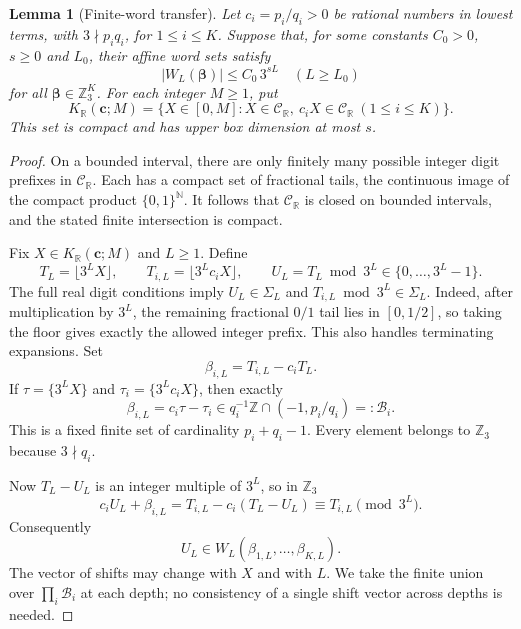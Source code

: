 \documentclass[11pt]{article}
\newtheorem{lemma}[theorem]{Lemma}
\theoremstyle{definition}
\theoremstyle{remark}
\newcommand{\Z}{\mathbb Z}
\newcommand{\R}{\mathbb R}
\newcommand{\Sig}{\Sigma}
\newcommand{\CR}{\mathcal C_{\R}}
\begin{document}
\begin{lemma}[Finite-word transfer]\label{real:lem:transfer}
Let $c_i=p_i/q_i>0$ be rational numbers in lowest terms, with
$3\nmid p_iq_i$, for $1\le i\le K$. Suppose that, for some constants
$C_0>0$, $s\ge0$ and $L_0$, their affine word sets satisfy
\[
 |W_L(\boldsymbol\beta)|\le C_0\,3^{sL}
 \quad(L\ge L_0)
\]
for all $\boldsymbol\beta\in\Z_3^K$. For each integer $M\ge1$, put
\[
 K_{\R}(\boldsymbol c;M)=
 \{X\in[0,M]:X\in\CR,\ c_iX\in\CR\ (1\le i\le K)\}.
\]
This set is compact and has upper box dimension at most $s$.
\end{lemma}
\begin{proof}
On a bounded interval, there are only finitely many possible integer
digit prefixes in $\CR$. Each has a compact set of fractional tails,
the continuous image of the compact product $\{0,1\}^{\mathbb N}$.
It follows that $\CR$ is closed on bounded intervals, and the stated
finite intersection is compact.

Fix $X\in K_{\R}(\boldsymbol c;M)$ and $L\ge1$. Define
\[
 T_L=\lfloor3^LX\rfloor,\qquad
 T_{i,L}=\lfloor3^Lc_iX\rfloor,\qquad
 U_L=T_L\bmod3^L\in\{0,\ldots,3^L-1\}.
\]
The full real digit conditions imply
$U_L\in\Sig_L$ and $T_{i,L}\bmod3^L\in\Sig_L$.
Indeed, after multiplication by $3^L$, the remaining fractional
$0/1$ tail lies in $[0,1/2]$, so taking the floor gives exactly the
allowed integer prefix. This also handles terminating expansions.
Set
\[
 \beta_{i,L}=T_{i,L}-c_iT_L.
\]
If $\tau=\{3^LX\}$ and $\tau_i=\{3^Lc_iX\}$, then exactly
\begin{equation}\label{real:eq:beta}
 \beta_{i,L}=c_i\tau-\tau_i
 \in q_i^{-1}\Z\cap(-1,p_i/q_i)=:\mathcal B_i.
\end{equation}
This is a fixed finite set of cardinality $p_i+q_i-1$. Every element
belongs to $\Z_3$ because $3\nmid q_i$.

Now $T_L-U_L$ is an integer multiple of $3^L$, so in $\Z_3$
\[
 c_iU_L+\beta_{i,L}
 =T_{i,L}-c_i(T_L-U_L)\equiv T_{i,L}\pmod{3^L}.
\]
Consequently
\begin{equation}\label{real:eq:membership}
 U_L\in W_L(\beta_{1,L},\ldots,\beta_{K,L}).
\end{equation}
The vector of shifts may change with $X$ and with $L$. We take the finite
union over $\prod_i\mathcal B_i$ at each depth; no consistency of a
single shift vector across depths is needed.


\end{proof}
\end{document}
